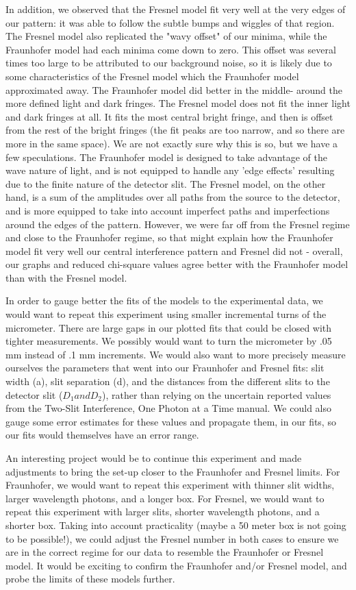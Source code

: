 \documentclass[prb,preprint]{revtex4-1}
\begin{document}
In addition, we observed that the Fresnel model fit very well at the very edges of our pattern:  it was able to follow the subtle bumps and wiggles of that region.  The Fresnel model also replicated the "wavy offset" of our minima, while the Fraunhofer model had each minima come down to zero.  This offset was several times too large to be attributed to our background noise, so it is likely due to some characteristics of the Fresnel model which the Fraunhofer model approximated away.  The Fraunhofer model did better in the middle- around the more defined light and dark fringes.  The Fresnel model does not fit the inner light and dark fringes at all.  It fits the most central bright fringe, and then is offset from the rest of the bright fringes (the fit peaks are too narrow, and so there are more in the same space).  We are not exactly sure why this is so, but we have a few speculations.    The Fraunhofer model is designed to take advantage of the wave nature of light, and is not equipped to handle any 'edge effects' resulting due to the finite nature of the detector slit.  The Fresnel model, on the other hand, is a sum of the amplitudes over all paths from the source to the detector, and is more equipped to take into account imperfect paths and imperfections around the edges of the pattern.   However, we were far off from the Fresnel regime and close to the Fraunhofer regime, so that might explain how the Fraunhofer model fit very well our central interference pattern and Fresnel did not - overall, our graphs and reduced chi-square values agree better with the Fraunhofer model than with the Fresnel model.  \cite{teachspin}

In order to gauge better the fits of the models to the experimental data, we would want to repeat this experiment using smaller incremental turns of the micrometer.  There are large gaps in our plotted fits that could be closed with tighter measurements.  We possibly would want to turn the micrometer by .05 mm instead of .1 mm increments.  We would also want to more precisely measure ourselves the parameters that went into our Fraunhofer and Fresnel fits:  slit width (a), slit separation (d), and the distances from the different slits to the detector slit ($D_{1} and D_{2}$), rather than relying on the uncertain reported values from the Two-Slit Interference, One Photon at a Time manual.  We could also gauge some error estimates for these values and propagate them, in our fits, so our fits would themselves have an error range.

An interesting project would be to continue this experiment and made adjustments to bring the set-up closer to the Fraunhofer and Fresnel limits.  For Fraunhofer, we would want to repeat this experiment with thinner slit widths, larger wavelength photons, and a longer box.  For Fresnel, we would want to repeat this experiment with larger slits, shorter wavelength photons, and a shorter box.  Taking into account practicality (maybe a 50 meter box is not going to be possible!), we could adjust the Fresnel number in both cases to ensure we are in the correct regime for our data to resemble the Fraunhofer or Fresnel model.  It would be exciting to confirm the Fraunhofer and/or Fresnel model, and probe the limits of these models further.
\end{document}

